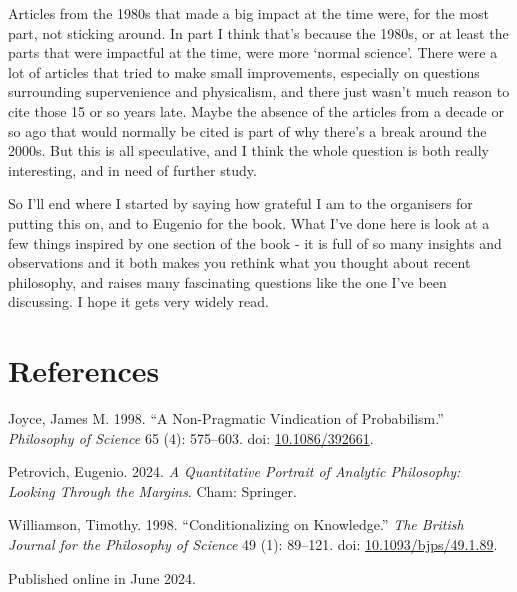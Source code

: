 \documentclass[
  10pt,
  letterpaper,
  DIV=11,
  numbers=noendperiod,
  twoside]{scrartcl}
\newlength{\cslhangindent}
\newenvironment{CSLReferences}[2] %
 {\begin{list}{}{%
  \setlength{\itemindent}{0pt}
  \setlength{\leftmargin}{0pt}
  \setlength{\parsep}{0pt}
  \ifodd #1
   \setlength{\leftmargin}{\cslhangindent}
   \setlength{\itemindent}{-1\cslhangindent}
  \fi
  \setlength{\itemsep}{#2\baselineskip}}}
 {\end{list}}
\begin{document}
\begin{longtable}[]{@{}
  >{\raggedright\arraybackslash}p{}
  >{\raggedleft\arraybackslash}p{}@{}}
\end{longtable}

Articles from the 1980s that made a big impact at the time were, for the
most part, not sticking around. In part I think that's because the
1980s, or at least the parts that were impactful at the time, were more
`normal science'. There were a lot of articles that tried to make small
improvements, especially on questions surrounding supervenience and
physicalism, and there just wasn't much reason to cite those 15 or so
years late. Maybe the absence of the articles from a decade or so ago
that would normally be cited is part of why there's a break around the
2000s. But this is all speculative, and I think the whole question is
both really interesting, and in need of further study.

So I'll end where I started by saying how grateful I am to the
organisers for putting this on, and to Eugenio for the book. What I've
done here is look at a few things inspired by one section of the book -
it is full of so many insights and observations and it both makes you
rethink what you thought about recent philosophy, and raises many
fascinating questions like the one I've been discussing. I hope it gets
very widely read.

\section*{References}\label{references}

\label{refs}
\begin{CSLReferences}{1}{0}
Joyce, James M. 1998. {``A Non-Pragmatic Vindication of Probabilism.''}
\emph{Philosophy of Science} 65 (4): 575--603. doi:
\href{https://doi.org/10.1086/392661}{10.1086/392661}.

Petrovich, Eugenio. 2024. \emph{A Quantitative Portrait of Analytic
Philosophy: Looking Through the Margins}. Cham: Springer.

Williamson, Timothy. 1998. {``Conditionalizing on Knowledge.''}
\emph{The British Journal for the Philosophy of Science} 49 (1):
89--121. doi:
\href{https://doi.org/10.1093/bjps/49.1.89}{10.1093/bjps/49.1.89}.

\end{CSLReferences}



\noindent Published online in June 2024.
\end{document}
